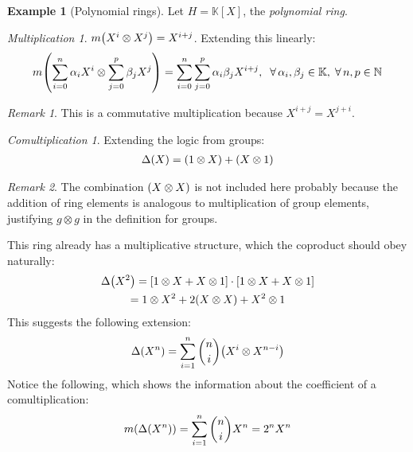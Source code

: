 \documentclass{article}
\theoremstyle{definition}
\newtheorem{Example}{Example}
\theoremstyle{remark}
\newtheorem*{Remark*}{Remark}
\theoremstyle{underline}
\newtheorem*{Multiplication*}{Multiplication}
\theoremstyle{underline}
\newtheorem*{Comultiplication*}{Comultiplication}
\begin{document}
	
	\begin{Example}[Polynomial rings]
		Let $H = \mathbb{K}[X]$, the \emph{polynomial ring}.
		
		\begin{Multiplication*}
			$m\pqty{X^i \otimes X^j} = X^{i+j}$. Extending this linearly:
			\begin{gather*}
			m\pqty{\sum_{i = 0}^n \alpha_i X^i \otimes \sum_{j = 0}^p \beta_j X^j} = \sum_{i = 0}^n \sum_{j = 0}^p \alpha_i \beta_j X^{i+j},\;\; \forall\,\alpha_i,\beta_j \in \mathbb K,\; \forall\,	n, p\in \mathbb N
			\end{gather*}
		\end{Multiplication*}
		
		\begin{Remark*}
			This is a commutative multiplication because $X^{i + j} = X^{j + i}$.
		\end{Remark*}
		
		\begin{Comultiplication*}
			Extending the logic from groups:
			\begin{gather*}
			\Delta\pqty{X} = \pqty{1 \otimes X} + \pqty{X \otimes 1}
			\end{gather*}
		\end{Comultiplication*}
		
		\begin{Remark*}
			The combination $\pqty{X \otimes X}$ is not included here probably because the addition of ring elements is analogous to multiplication of group elements, justifying $g \otimes g$ in the definition for groups. \\
		\end{Remark*}
		
		This ring already has a multiplicative structure, which the coproduct should obey naturally:
		\begin{gather*}
		\Delta\pqty{X^2} = \bqty{1 \otimes X + X \otimes 1} \cdot \bqty{1 \otimes X + X \otimes 1} \\
		= 1 \otimes X^2 + 2\pqty{X\otimes X} + X^2 \otimes 1 
		\end{gather*}
		This suggests the following extension:
		\begin{gather*}
		\Delta\pqty{X^{n}} = \sum_{i=1}^{n} \binom{n}{i}\pqty{X^{i} \otimes X^{n-i}} 
		\end{gather*}
		Notice the following, which shows the information about the coefficient of a comultiplication:
		\begin{gather*}
		m\pqty{\Delta\pqty{X^n}} = \sum_{i=1}^{n} \binom{n}{i}X^n =  2^nX^n
		\end{gather*}
		
	\end{Example}
	
\end{document}
